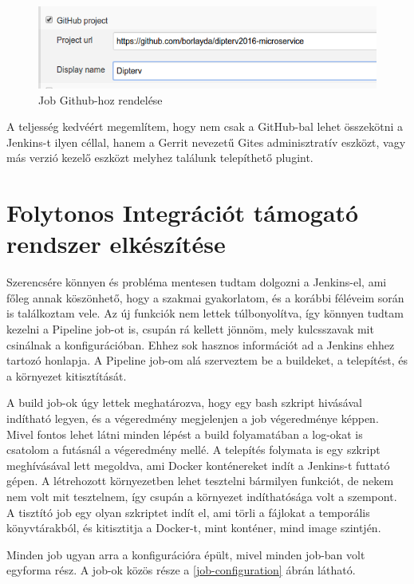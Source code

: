 \documentclass[11pt,magyar,a4paper,twoside,]{report}
\let\Oldincludegraphics\includegraphics
\renewcommand{\includegraphics}[1]{
\begin{adjustbox}{max size={\textwidth}{\textheight}}
    \Oldincludegraphics[scale=0.6]{#1}%
\end{adjustbox}
}
\begin{document}
\begin{figure}[H]
\centering
\includegraphics{img/github-job-conf.png}
\caption{Job Github-hoz rendelése\label{job-conf}}
\end{figure}

A teljesség kedvéért megemlítem, hogy nem csak a GitHub-bal lehet
összekötni a Jenkins-t ilyen céllal, hanem a Gerrit nevezetű Gites
adminisztratív eszközt, vagy más verzió kezelő eszközt melyhez találunk
telepíthető plugint.

\section{Folytonos Integrációt támogató rendszer
elkészítése}\label{folytonos-integruxe1ciuxf3t-tuxe1mogatuxf3-rendszer-elkuxe9szuxedtuxe9se}

Szerencsére könnyen és probléma mentesen tudtam dolgozni a Jenkins-el,
ami főleg annak köszönhető, hogy a szakmai gyakorlatom, és a korábbi
féléveim során is találkoztam vele. Az új funkciók nem lettek
túlbonyolítva, így könnyen tudtam kezelni a Pipeline job-ot is, csupán
rá kellett jönnöm, mely kulcsszavak mit csinálnak a konfigurációban.
Ehhez sok hasznos információt ad a Jenkins ehhez tartozó
honlapja\citep{jenkins-pipeline}. A Pipeline job-om alá szerveztem be a
buildeket, a telepítést, és a környezet kitisztítását.

A build job-ok úgy lettek meghatározva, hogy egy bash szkript hivásával
indítható legyen, és a végeredmény megjelenjen a job végeredménye
képpen. Mivel fontos lehet látni minden lépést a build folyamatában a
log-okat is csatolom a futásnál a végeredmény mellé. A telepítés
folymata is egy szkript meghívásával lett megoldva, ami Docker
konténereket indít a Jenkins-t futtató gépen. A létrehozott környezetben
lehet tesztelni bármilyen funkciót, de nekem nem volt mit tesztelnem,
így csupán a környezet indíthatósága volt a szempont. A tisztító job egy
olyan szkriptet indít el, ami törli a fájlokat a temporális
könyvtárakból, és kitisztitja a Docker-t, mint konténer, mind image
szintjén.

Minden job ugyan arra a konfigurációra épült, mivel minden job-ban volt
egyforma rész. A job-ok közös része a \ref{job-configuration} ábrán
látható.
\end{document}
